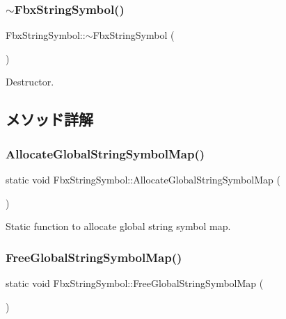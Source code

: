 \subsubsection{\texorpdfstring{$\sim$\+Fbx\+String\+Symbol()}{~FbxStringSymbol()}}
{\footnotesize\ttfamily Fbx\+String\+Symbol\+::$\sim$\+Fbx\+String\+Symbol (\begin{DoxyParamCaption}{ }\end{DoxyParamCaption})}



Destructor. 



\subsection{メソッド詳解}
\mbox{\label{class_fbx_string_symbol_a1cee4d23670bba6901cbf8ed23b494de}} 
\subsubsection{\texorpdfstring{Allocate\+Global\+String\+Symbol\+Map()}{AllocateGlobalStringSymbolMap()}}
{\footnotesize\ttfamily static void Fbx\+String\+Symbol\+::\+Allocate\+Global\+String\+Symbol\+Map (\begin{DoxyParamCaption}{ }\end{DoxyParamCaption})\hspace{0.3cm}{\ttfamily [static]}}



Static function to allocate global string symbol map. 

\mbox{\label{class_fbx_string_symbol_ae2abd3332bb370ee215955e77f21e906}} 
\subsubsection{\texorpdfstring{Free\+Global\+String\+Symbol\+Map()}{FreeGlobalStringSymbolMap()}}
{\footnotesize\ttfamily static void Fbx\+String\+Symbol\+::\+Free\+Global\+String\+Symbol\+Map (\begin{DoxyParamCaption}{ }\end{DoxyParamCaption})\hspace{0.3cm}{\ttfamily [static]}}




